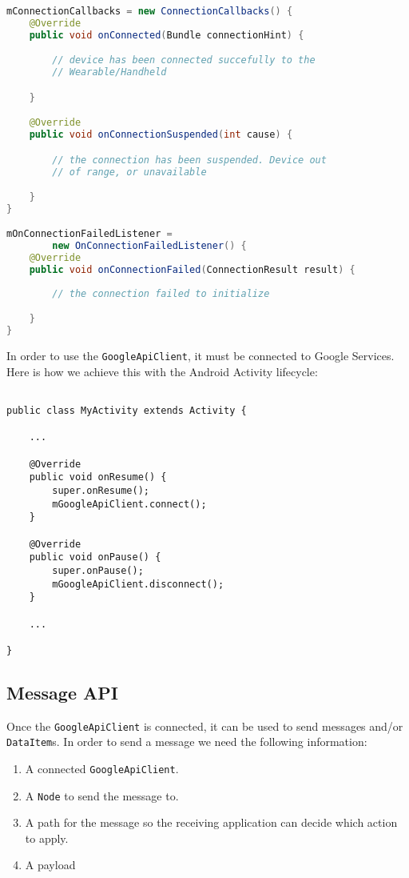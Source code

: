 \begin{lstlisting}[language=Java]
mConnectionCallbacks = new ConnectionCallbacks() {
    @Override
    public void onConnected(Bundle connectionHint) {

        // device has been connected succefully to the
        // Wearable/Handheld

    }

    @Override
    public void onConnectionSuspended(int cause) {

        // the connection has been suspended. Device out
        // of range, or unavailable

    }
}

mOnConnectionFailedListener =
        new OnConnectionFailedListener() {
    @Override
    public void onConnectionFailed(ConnectionResult result) {
        
        // the connection failed to initialize

    }
}

\end{lstlisting}

In order to use the \texttt{GoogleApiClient}, it must be connected to Google
Services. Here is how we achieve this with the Android Activity lifecycle:

\begin{lstlisting}

public class MyActivity extends Activity {

    ...

    @Override
    public void onResume() {
        super.onResume();
        mGoogleApiClient.connect();
    }

    @Override
    public void onPause() {
        super.onPause();
        mGoogleApiClient.disconnect();
    }

    ...

}

\end{lstlisting}


\subsection{Message API}

Once the \texttt{GoogleApiClient} is connected, it can be used to send messages
and/or \texttt{DataItem}s. In order to send a message we need the following
information:

\begin{enumerate}
\item A connected \texttt{GoogleApiClient}.
\item A \texttt{Node} to send the message to.
\item A path for the message so the receiving application can decide which
    action to apply.
\item A payload
\end{enumerate}

